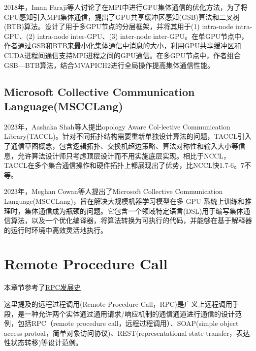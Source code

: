 \documentclass[a4paper,twoside]{scrbook}
\begin{document}
\begin{CJK}{UTF8}{gbsn}
2018年，Iman Faraji\cite{cpe4667}等人讨论了在MPI中进行GPU集体通信的优化方法，为了将GPU感知引入MPI集体通信，提出了GPU共享缓冲区感知(GSB)算法和二叉树(BTB)算法。设计了用于多GPU节点的分层框架，并将其用于(1) intra-node intra-GPU、(2) intra-node inter-GPU、(3) inter-node inter-GPU。在单GPU节点中，作者通过GSB和BTB来最小化集体通信中消息的大小，利用GPU共享缓冲区和CUDA进程间通信支持MPI进程之间的GPU通信。在多GPU节点中，作者组合GSB—BTB算法，结合MVAPICH2进行全局操作提高集体通信性能。
\subsection{Microsoft Collective Communication Language(MSCCLang)}
2023年，Aashaka Shah\cite{shah2023taccl}等人提出opology Aware Col-lective Communication Library(TACCL)。针对不同拓扑结构需要重新单独设计算法的问题，TACCL引入了通信草图概念，包含逻辑拓扑、交换机超边策略、算法对称性和输入大小等信息，允许算法设计师只考虑顶层设计而不用实施底层实现。相比于NCCL，TACCL在多个集合通信操作和硬件拓扑上都展现出了优势，比NCCL快1.7-6。7不等。

2023年，Meghan Cowan\cite{cowan2023mscclang}等人提出了Microsoft Collective Communication Language(MSCCLang)，旨在解决大规模机器学习模型在多 GPU 系统上训练和推理时，集体通信成为瓶颈的问题。它包含一个领域特定语言(DSL)用于编写集体通信算法，以及一个优化编译器，将算法转换为可执行的代码，并能够在基于解释器的运行时环境中高效灵活地执行。
\section{Remote Procedure Call}
本章节参考了\href{https://cloud.tencent.com/developer/article/1619589}{RPC发展史}

这里提及的远程过程调用(Remote Procedure Call，RPC)是广义上远程调用手段，是一种允许两个实体通过通用请求/响应机制的通信通道进行通信的设计范例，包括RPC（remote procedure call，远程过程调用）、SOAP(simple object access protoal，简单对象访问协议)、REST(representational state transfer，表达性状态转移)等设计范例。


\end{CJK}
\end{document}
